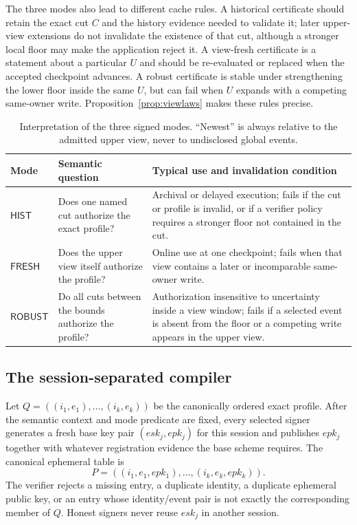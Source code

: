 \documentclass[11pt]{article}
\theoremstyle{definition}
\begin{document}
The three modes also lead to different cache rules.  A historical certificate should retain the exact cut $C$ and the history evidence needed to validate it; later upper-view extensions do not invalidate the existence of that cut, although a stronger local floor may make the application reject it.  A view-fresh certificate is a statement about a particular $U$ and should be re-evaluated or replaced when the accepted checkpoint advances.  A robust certificate is stable under strengthening the lower floor inside the same $U$, but can fail when $U$ expands with a competing same-owner write.  Proposition~\ref{prop:viewlaws} makes these rules precise.

\begin{table}[t]
\centering
\caption{Interpretation of the three signed modes.  ``Newest'' is always relative to the admitted upper view, never to undisclosed global events.}
\label{tab:modes}
\begin{tabularx}{\linewidth}{@{}p{.17\linewidth}p{.24\linewidth}X@{}}
\toprule
Mode & Semantic question & Typical use and invalidation condition\\
\midrule
$\mathsf{HIST}$ & Does one named cut authorize the exact profile? & Archival or delayed execution; fails if the cut or profile is invalid, or if a verifier policy requires a stronger floor not contained in the cut.\\
$\mathsf{FRESH}$ & Does the upper view itself authorize the profile? & Online use at one checkpoint; fails when that view contains a later or incomparable same-owner write.\\
$\mathsf{ROBUST}$ & Do all cuts between the bounds authorize the profile? & Authorization insensitive to uncertainty inside a view window; fails if a selected event is absent from the floor or a competing write appears in the upper view.\\
\bottomrule
\end{tabularx}
\end{table}

\subsection{The session-separated compiler}\label{subsec:session-compiler}
Let $Q=((i_1,e_1),\ldots,(i_k,e_k))$ be the canonically ordered exact profile.  After the semantic context and mode predicate are fixed, every selected signer generates a fresh base key pair $(esk_j,epk_j)$ for this session and publishes $epk_j$ together with whatever registration evidence the base scheme requires.  The canonical ephemeral table is
\[
 P=((i_1,e_1,epk_1),\ldots,(i_k,e_k,epk_k)).
\]
The verifier rejects a missing entry, a duplicate identity, a duplicate ephemeral public key, or an entry whose identity/event pair is not exactly the corresponding member of $Q$.  Honest signers never reuse $esk_j$ in another session.
\end{document}
